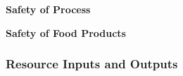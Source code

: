 \documentclass{report}
\begin{document}
\textbf{Safety of Process}
\label{sec:safety-process}






\textbf{Safety of Food Products}
\label{sec:safety-products}





\subsubsection{Resource Inputs and Outputs}
\label{sec:resource}

\end{document}
